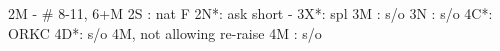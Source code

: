 2M - # 8-11, 6+M
2S : nat F
2N*: ask short
   - 3X*: spl
3M : s/o
3N : s/o
4C*: ORKC
4D*: s/o 4M, not allowing re-raise
4M : s/o